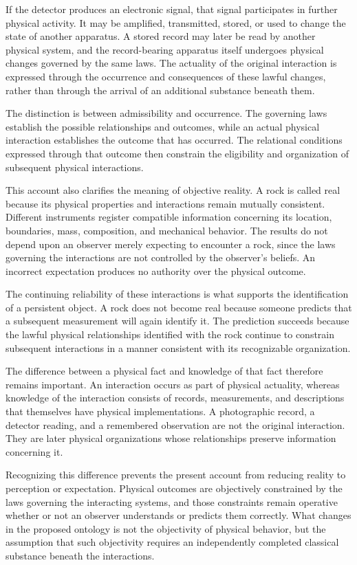 \documentclass[12pt,onecolumn]{article}
\begin{document}
If the detector produces an electronic signal, that signal participates in further physical activity. It may be amplified, transmitted, stored, or used to change the state of another apparatus. A stored record may later be read by another physical system, and the record-bearing apparatus itself undergoes physical changes governed by the same laws. The actuality of the original interaction is expressed through the occurrence and consequences of these lawful changes, rather than through the arrival of an additional substance beneath them.

The distinction is between admissibility and occurrence. The governing laws establish the possible relationships and outcomes, while an actual physical interaction establishes the outcome that has occurred. The relational conditions expressed through that outcome then constrain the eligibility and organization of subsequent physical interactions.

This account also clarifies the meaning of objective reality. A rock is called real because its physical properties and interactions remain mutually consistent. Different instruments register compatible information concerning its location, boundaries, mass, composition, and mechanical behavior. The results do not depend upon an observer merely expecting to encounter a rock, since the laws governing the interactions are not controlled by the observer's beliefs. An incorrect expectation produces no authority over the physical outcome.

The continuing reliability of these interactions is what supports the identification of a persistent object. A rock does not become real because someone predicts that a subsequent measurement will again identify it. The prediction succeeds because the lawful physical relationships identified with the rock continue to constrain subsequent interactions in a manner consistent with its recognizable organization.

The difference between a physical fact and knowledge of that fact therefore remains important. An interaction occurs as part of physical actuality, whereas knowledge of the interaction consists of records, measurements, and descriptions that themselves have physical implementations. A photographic record, a detector reading, and a remembered observation are not the original interaction. They are later physical organizations whose relationships preserve information concerning it.

Recognizing this difference prevents the present account from reducing reality to perception or expectation. Physical outcomes are objectively constrained by the laws governing the interacting systems, and those constraints remain operative whether or not an observer understands or predicts them correctly. What changes in the proposed ontology is not the objectivity of physical behavior, but the assumption that such objectivity requires an independently completed classical substance beneath the interactions.
\end{document}
